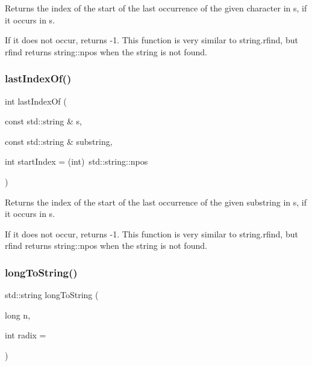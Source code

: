 Returns the index of the start of the last occurrence of the given character in s, if it occurs in s. 

If it does not occur, returns -\/1. This function is very similar to string.\+rfind, but rfind returns string\+::npos when the string is not found. \mbox{\label{namespacesgl_1_1priv_1_1strlib_acdad5d6c6003d11b1f4d2c10deadcc28}} 
\subsubsection{\texorpdfstring{last\+Index\+Of()}{lastIndexOf()}\hspace{0.1cm}{\footnotesize\ttfamily [2/2]}}
{\footnotesize\ttfamily int last\+Index\+Of (\begin{DoxyParamCaption}\item[{const std\+::string \&}]{s,  }\item[{const std\+::string \&}]{substring,  }\item[{int}]{start\+Index = {\ttfamily (int)~std\+:\+:string\+:\+:npos} }\end{DoxyParamCaption})}



Returns the index of the start of the last occurrence of the given substring in s, if it occurs in s. 

If it does not occur, returns -\/1. This function is very similar to string.\+rfind, but rfind returns string\+::npos when the string is not found. \mbox{\label{namespacesgl_1_1priv_1_1strlib_a2abafd3e6dc4ddbb44d13b691ed962da}} 
\subsubsection{\texorpdfstring{long\+To\+String()}{longToString()}}
{\footnotesize\ttfamily std\+::string long\+To\+String (\begin{DoxyParamCaption}\item[{long}]{n,  }\item[{int}]{radix = {} }\end{DoxyParamCaption})}



